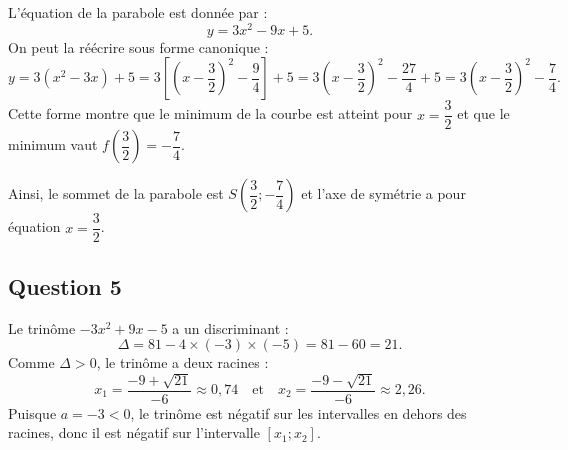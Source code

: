 \documentclass[10pt]{article}
\begin{document}
	L'équation de la parabole est donnée par :
	\[
	y = 3x^2 - 9x + 5.
	\]
	On peut la réécrire sous forme canonique :
	\[
	y = 3 \left( x^2 - 3x \right) + 5 = 3 \left[ \left( x - \dfrac{3}{2} \right)^2 - \dfrac{9}{4} \right] + 5 = 3 \left( x - \dfrac{3}{2} \right)^2 - \dfrac{27}{4} + 5 = 3 \left( x - \dfrac{3}{2} \right)^2 - \dfrac{7}{4}.
	\]
	Cette forme montre que le minimum de la courbe est atteint pour $x = \dfrac{3}{2}$ et que le minimum vaut $f\left( \dfrac{3}{2} \right) = -\dfrac{7}{4}$.
	
	Ainsi, le sommet de la parabole est $S\left( \dfrac{3}{2} ; -\dfrac{7}{4} \right)$ et l'axe de symétrie a pour équation $x = \dfrac{3}{2}$.
	
	\subsection*{Question 5}
	
	Le trinôme $-3x^2 + 9x - 5$ a un discriminant :
	\[
	\Delta = 81 - 4 \times (-3) \times (-5) = 81 - 60 = 21.
	\]
	Comme $\Delta > 0$, le trinôme a deux racines :
	\[
	x_1 = \dfrac{-9 + \sqrt{21}}{-6} \approx 0,74 \quad \text{et} \quad x_2 = \dfrac{-9 - \sqrt{21}}{-6} \approx 2,26.
	\]
	Puisque $a = -3 < 0$, le trinôme est négatif sur les intervalles en dehors des racines, donc il est négatif sur l'intervalle $[x_1 ; x_2]$.
\end{document}
